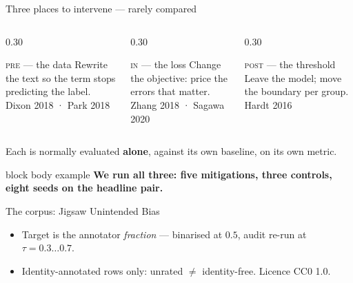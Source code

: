 \documentclass[aspectratio=169,11pt,xcolor={table}]{beamer}
\newcommand{\takeaway}[1]{%
  \vspace{0.6ex}%
  \begin{beamercolorbox}[wd=\textwidth,sep=1.0ex,rounded=true]{block body example}%
    \small\textbf{#1}%
  \end{beamercolorbox}}
\newcommand{\hint}[1]{{\footnotesize\color{fairgrey}#1}}
\begin{document}
\begin{frame}{Three places to intervene --- rarely compared}
  \vspace{2.0ex}
  \begin{columns}[t,onlytextwidth]
    \begin{column}{0.30\textwidth}
      \begin{block}{\textsc{pre} --- the data}
        \small Rewrite the text so the term stops predicting the label.\\[0.6ex]
        \hint{Dixon 2018 · Park 2018}
      \end{block}
    \end{column}
    \begin{column}{0.30\textwidth}
      \begin{block}{\textsc{in} --- the loss}
        \small Change the objective: price the errors that matter.\\[0.6ex]
        \hint{Zhang 2018 · Sagawa 2020}
      \end{block}
    \end{column}
    \begin{column}{0.30\textwidth}
      \begin{block}{\textsc{post} --- the threshold}
        \small Leave the model; move the boundary per group.\\[0.6ex]
        \hint{Hardt 2016}
      \end{block}
    \end{column}
  \end{columns}

  \vspace{3.0ex}
  \centerline{\small Each is normally evaluated \textbf{alone}, against its own
    baseline, on its own metric.}

  \takeaway{We run all three: five mitigations, three controls, eight seeds on
    the headline pair.}
\end{frame}

\begin{frame}{The corpus: Jigsaw Unintended Bias}
  \vspace{2.2ex}
  \begin{center}
    \small
    
  \end{center}
  \vspace{2.2ex}
  \small
  \begin{itemize}
    \item Target is the annotator \emph{fraction} --- binarised at $0.5$, audit
      re-run at $\tau = 0.3 \ldots 0.7$.
    \item Identity-annotated rows only: unrated $\neq$ identity-free. Licence
      CC0 1.0.
  \end{itemize}
\end{frame}
\end{document}
